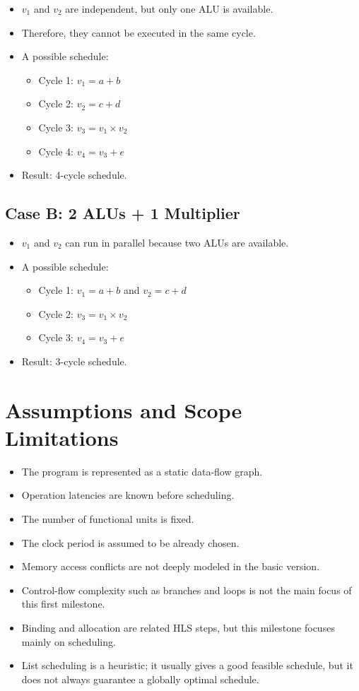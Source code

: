 \documentclass[11pt,a4paper]{article}
\begin{document}
\begin{itemize}[leftmargin=*]
    \item $v_1$ and $v_2$ are independent, but only one ALU is available.
    \item Therefore, they cannot be executed in the same cycle.
    \item A possible schedule:
    \begin{itemize}
        \item Cycle 1: $v_1=a+b$
        \item Cycle 2: $v_2=c+d$
        \item Cycle 3: $v_3=v_1 \times v_2$
        \item Cycle 4: $v_4=v_3+e$
    \end{itemize}
    \item Result: 4-cycle schedule.
\end{itemize}

\subsection*{Case B: 2 ALUs + 1 Multiplier}

\begin{itemize}[leftmargin=*]
    \item $v_1$ and $v_2$ can run in parallel because two ALUs are available.
    \item A possible schedule:
    \begin{itemize}
        \item Cycle 1: $v_1=a+b$ and $v_2=c+d$
        \item Cycle 2: $v_3=v_1 \times v_2$
        \item Cycle 3: $v_4=v_3+e$
    \end{itemize}
    \item Result: 3-cycle schedule.
\end{itemize}

\section{Assumptions and Scope Limitations}

\begin{itemize}[leftmargin=*]
    \item The program is represented as a static data-flow graph.
    \item Operation latencies are known before scheduling.
    \item The number of functional units is fixed.
    \item The clock period is assumed to be already chosen.
    \item Memory access conflicts are not deeply modeled in the basic version.
    \item Control-flow complexity such as branches and loops is not the main focus of this first milestone.
    \item Binding and allocation are related HLS steps, but this milestone focuses mainly on scheduling.
    \item List scheduling is a heuristic; it usually gives a good feasible schedule, but it does not always guarantee a globally optimal schedule.
\end{itemize}
\end{document}
